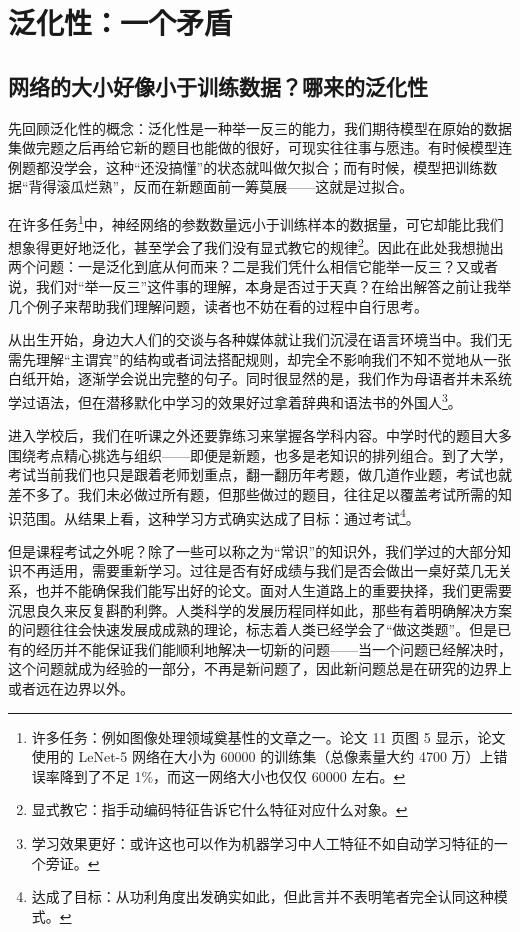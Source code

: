\section{泛化性：一个矛盾}

\subsection{网络的大小好像小于训练数据？哪来的泛化性}

先回顾泛化性的概念：泛化性是一种举一反三的能力，我们期待模型在原始的数据集做完题之后再给它新的题目也能做的很好，可现实往往事与愿违。有时候模型连例题都没学会，这种“还没搞懂”的状态就叫做欠拟合；而有时候，模型把训练数据“背得滚瓜烂熟”，反而在新题面前一筹莫展——这就是过拟合。

在许多任务\footnote{许多任务：例如图像处理领域奠基性的文章之一。论文 11 页图 5 显示，论文使用的 LeNet-5 网络在大小为 60000 的训练集（总像素量大约 4700 万）上错误率降到了不足 1\%，而这一网络大小也仅仅 60000 左右。}中，神经网络的参数数量远小于训练样本的数据量，可它却能比我们想象得更好地泛化，甚至学会了我们没有显式教它的规律\footnote{显式教它：指手动编码特征告诉它什么特征对应什么对象。}。因此在此处我想抛出两个问题：一是泛化到底从何而来？二是我们凭什么相信它能举一反三？又或者说，我们对“举一反三”这件事的理解，本身是否过于天真？在给出解答之前让我举几个例子来帮助我们理解问题，读者也不妨在看的过程中自行思考。

从出生开始，身边大人们的交谈与各种媒体就让我们沉浸在语言环境当中。我们无需先理解“主谓宾”的结构或者词法搭配规则，却完全不影响我们不知不觉地从一张白纸开始，逐渐学会说出完整的句子。同时很显然的是，我们作为母语者并未系统学过语法，但在潜移默化中学习的效果好过拿着辞典和语法书的外国人\footnote{学习效果更好：或许这也可以作为机器学习中人工特征不如自动学习特征的一个旁证。}。

进入学校后，我们在听课之外还要靠练习来掌握各学科内容。中学时代的题目大多围绕考点精心挑选与组织——即便是新题，也多是老知识的排列组合。到了大学，考试当前我们也只是跟着老师划重点，翻一翻历年考题，做几道作业题，考试也就差不多了。我们未必做过所有题，但那些做过的题目，往往足以覆盖考试所需的知识范围。从结果上看，这种学习方式确实达成了目标：通过考试\footnote{达成了目标：从功利角度出发确实如此，但此言并不表明笔者完全认同这种模式。}。

但是课程考试之外呢？除了一些可以称之为“常识”的知识外，我们学过的大部分知识不再适用，需要重新学习。过往是否有好成绩与我们是否会做出一桌好菜几无关系，也并不能确保我们能写出好的论文。面对人生道路上的重要抉择，我们更需要沉思良久来反复斟酌利弊。人类科学的发展历程同样如此，那些有着明确解决方案的问题往往会快速发展成成熟的理论，标志着人类已经学会了“做这类题”。但是已有的经历并不能保证我们能顺利地解决一切新的问题——当一个问题已经解决时，这个问题就成为经验的一部分，不再是新问题了，因此新问题总是在研究的边界上或者远在边界以外。


